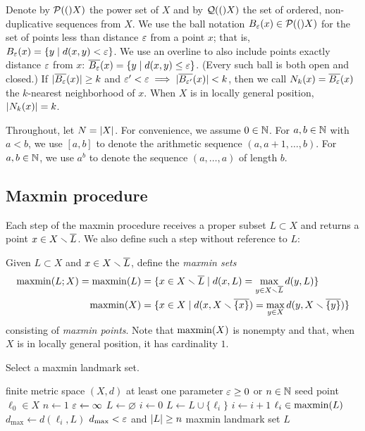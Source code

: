 \documentclass[
]{article}
\begin{document}
Denote by \(\mathcal{P}(()X)\) the power set of \(X\) and by \(\mathcal{Q}(()X)\) the
set of ordered, non-duplicative sequences from \(X\). We use the ball
notation \(B_{\varepsilon}(x) \in \mathcal{P}(()X)\) for the set of points less than
distance \(\varepsilon\) from a point \(x\); that is,
\(B_{\varepsilon}(x) = \{ y \mid d(x,y) < \varepsilon \}\). We use an overline to also
include points exactly distance \(\varepsilon\) from \(x\):
\(\overline{B_{\varepsilon}}(x) = \{ y \mid d(x,y) \leq \varepsilon \}\). (Every such ball
is both open and closed.) If \(\lvert \overline{B_\varepsilon}(x)\rvert \geq k\) and
\(\varepsilon'<\varepsilon \implies \lvert \overline{B_{\varepsilon'}}(x)\rvert < k\), then we call
\(N_k(x) = \overline{B_\varepsilon}(x)\) the \(k\)-nearest neighborhood of \(x\).
When \(X\) is in locally general position, \(\lvert N_k(x)\rvert = k\).

Throughout, let \(N=\lvert X\rvert\). For convenience, we assume \(0\in\mathbb{N}\).
For \(a,b \in \mathbb{N}\) with \(a<b\), we use \([a,b]\) to denote the
arithmetic sequence \((a,a+1,\ldots,b)\). For \(a,b \in \mathbb{N}\), we use
\(a^b\) to denote the sequence \((a,\ldots,a)\) of length \(b\).

\hypertarget{maxmin-procedure}{%
\subsection{Maxmin procedure}\label{maxmin-procedure}}

\label{sec:maxmin}

Each step of the maxmin procedure receives a proper subset
\(L\subset X\) and returns a point \(x\in X\smallsetminus \overline{L}\). We also define
such a step without reference to \(L\):

Given \(L\subset X\) and \(x\in X\smallsetminus \overline{L}\), define the
\emph{maxmin sets} \begin{align*}
    \operatorname{maxmin}(L;X) = \operatorname{maxmin}(L) &= \{x\in X \smallsetminus \overline{L}\mid d(x,L) = \max_{y\in X\smallsetminus \overline{L}}{d(y,L)}\} \\
    \operatorname{maxmin}(X) &= \{x\in X\mid d(x,X \smallsetminus \overline{\{x\}}) = \max_{y\in X}{d(y,X \smallsetminus \overline{\{y\}})}\}
\end{align*} consisting of \emph{maxmin points}. Note that
\(\operatorname{maxmin}(X)\) is nonempty and that, when \(X\) is in locally general
position, it has cardinality \(1\).

\begin{algorithm}
\caption{Select a maxmin landmark set.}
\label{alg:maxmin}
\begin{algorithmic}[1]
\REQUIRE finite metric space $(X,d)$
\REQUIRE at least one parameter $\varepsilon\geq 0$ or $n\in\mathbb{N}$
\REQUIRE seed point $\ell_0 \in X$
    \STATE $n \leftarrow 1$
\ENDIF
{}
    \STATE $\varepsilon \leftarrow \infty$
\ENDIF
\STATE $L \leftarrow \varnothing$
\STATE $i \leftarrow 0$
\REPEAT
    \STATE $L \leftarrow L\cup\{\ell_i\}$
    \STATE $i \leftarrow i+1$
    \STATE $\ell_i \in \operatorname{maxmin}(L)$
    \STATE $d_{\operatorname{max}} \leftarrow d(\ell_i,L)$
\UNTIL $d_{\operatorname{max}} < \varepsilon$ and $\lvert L\rvert \geq n$
\RETURN maxmin landmark set $L$
\end{algorithmic}
\end{algorithm}
\end{document}
